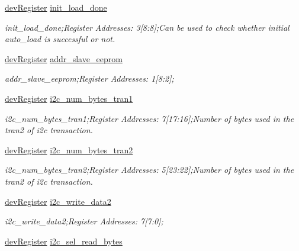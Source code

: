 \begin{DoxyCompactItemize}
\mbox{\hyperlink{classdev_register}{dev\+Register}} \mbox{\hyperlink{class_o_p_t3101_registers_a6e5ead741220099cce07cf99c64b958d}{init\+\_\+load\+\_\+done}}
\begin{DoxyCompactList}\small\item\em init\+\_\+load\+\_\+done;Register Addresses\+: 3\mbox{[}8\+:8\mbox{]};Can be used to check whether initial auto\+\_\+load is successful or not. \end{DoxyCompactList}\item 
\mbox{\hyperlink{classdev_register}{dev\+Register}} \mbox{\hyperlink{class_o_p_t3101_registers_a2bbd370649bdf154c9df95c66a16d839}{addr\+\_\+slave\+\_\+eeprom}}
\begin{DoxyCompactList}\small\item\em addr\+\_\+slave\+\_\+eeprom;Register Addresses\+: 1\mbox{[}8\+:2\mbox{]}; \end{DoxyCompactList}\item 
\mbox{\hyperlink{classdev_register}{dev\+Register}} \mbox{\hyperlink{class_o_p_t3101_registers_a3f34c97cad70b9975e407bef1367c837}{i2c\+\_\+num\+\_\+bytes\+\_\+tran1}}
\begin{DoxyCompactList}\small\item\em i2c\+\_\+num\+\_\+bytes\+\_\+tran1;Register Addresses\+: 7\mbox{[}17\+:16\mbox{]};Number of bytes used in the tran2 of i2c transaction. \end{DoxyCompactList}\item 
\mbox{\hyperlink{classdev_register}{dev\+Register}} \mbox{\hyperlink{class_o_p_t3101_registers_a4bfdbeff964934c25820ccc15374e3be}{i2c\+\_\+num\+\_\+bytes\+\_\+tran2}}
\begin{DoxyCompactList}\small\item\em i2c\+\_\+num\+\_\+bytes\+\_\+tran2;Register Addresses\+: 5\mbox{[}23\+:22\mbox{]};Number of bytes used in the tran2 of i2c transaction. \end{DoxyCompactList}\item 
\mbox{\hyperlink{classdev_register}{dev\+Register}} \mbox{\hyperlink{class_o_p_t3101_registers_a60f82b6d2ba125322a2bbd5a19d8cb24}{i2c\+\_\+write\+\_\+data2}}
\begin{DoxyCompactList}\small\item\em i2c\+\_\+write\+\_\+data2;Register Addresses\+: 7\mbox{[}7\+:0\mbox{]}; \end{DoxyCompactList}\item 
\mbox{\hyperlink{classdev_register}{dev\+Register}} \mbox{\hyperlink{class_o_p_t3101_registers_a77904680d88bd792a64a8647b0b33a3e}{i2c\+\_\+sel\+\_\+read\+\_\+bytes}}

\end{DoxyCompactItemize}
